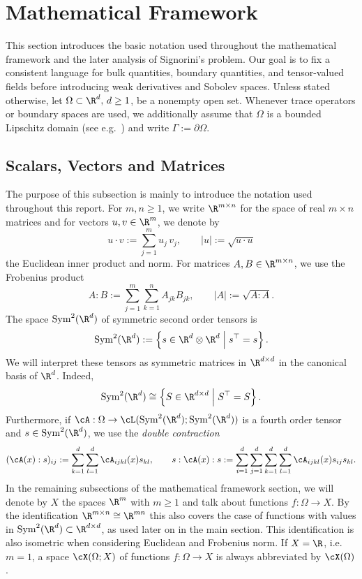 \section{Mathematical Framework}
This section introduces the basic notation used throughout the mathematical framework and the later analysis of Signorini's problem. Our goal is to fix a consistent language for bulk quantities, boundary quantities, and tensor-valued fields before introducing weak derivatives and Sobolev spaces. Unless stated otherwise, let $\Omega\subset\R^d,\,d\ge 1$, be a nonempty open set. Whenever trace operators or boundary spaces are used, we additionally assume that $\Omega$ is a bounded Lipschitz domain (see e.g.\ \cite[Section 2.3]{book}) and write $\Gamma:=\partial\Omega$.

\subsection{Scalars, Vectors and Matrices}\label{sec:SVM}
The purpose of this subsection is mainly to introduce the notation used throughout this report. For $m,n\ge 1$, we write $\R^{m\times n}$ for the space of real $m\times n$ matrices and for vectors $u,v\in\R^m$, we denote by
\begin{equation*}
	u\cdot v := \sum_{j=1}^m u_j\,v_j,
	\qquad
	|u| := \sqrt{u\cdot u}
\end{equation*}
the Euclidean inner product and norm. For matrices $A,B\in\R^{m\times n}$, we use the Frobenius product
\begin{equation*}
	A:B := \sum_{j=1}^m\sum_{k=1}^n A_{jk}B_{jk},
	\qquad
	|A| := \sqrt{A:A}.
\end{equation*}
The space $\mathrm{Sym}^2(\R^d)$ of symmetric second order tensors is
\begin{equation*}
	\mathrm{Sym}^2(\R^d):= \left\{ s\in\R^d\otimes\R^d\;\middle|\; s^\top = s\right\}.
\end{equation*}
We will interpret these tensors as symmetric matrices in $\R^{d\times d}$ in the canonical basis of $\R^d$. Indeed,
\begin{equation*}
	\mathrm{Sym}^2(\R^d)\cong \left\{S\in\R^{d\times d}\;\middle|\; S^\top = S\right\}.
\end{equation*}
Furthermore, if $\cA:\Omega\to\cL(\mathrm{Sym}^2(\R^d);\mathrm{Sym}^2(\R^d))$ is a fourth order tensor and $s\in\mathrm{Sym}^2(\R^d)$, we use the {\em double contraction}
\begin{equation*}
	(\cA(x):s)_{ij}:=\sum_{k = 1}^d \sum_{l = 1}^d \cA_{ijkl}(x)s_{kl},
	\qquad
	s:\cA(x):s:=\sum_{i = 1}^d \sum_{j = 1}^d \sum_{k = 1}^d \sum_{l = 1}^d\cA_{ijkl}(x)s_{ij}s_{kl}.
\end{equation*}
In the remaining subsections of the mathematical framework section, we will denote by $X$ the spaces $\R^m$ with $m\ge 1$ and talk about functions $f:\Omega\to X$. By the identification $\R^{m\times n}\cong\R^{mn}$ this also covers the case of functions with values in $\mathrm{Sym}^2(\R^d)\subset\R^{d\times d}$, as used later on in the main section. This identification is also isometric when considering Euclidean and Frobenius norm. If $X = \R$, i.e.\ $m=1$, a space $\cX(\Omega;X)$ of functions $f:\Omega\to X$ is always abbreviated by $\cX(\Omega)$.

